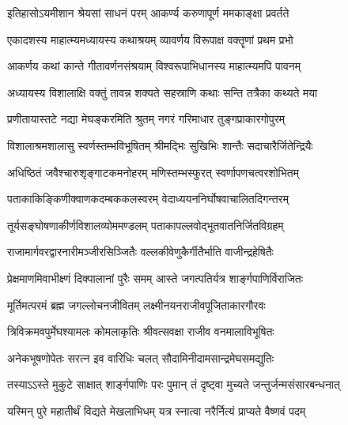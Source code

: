 \genMangalaShloka

\closesub

\ganapatyadiDhyanam
\padmaPuranam



\twolineshloka
{इतिहासोऽयमीशान श्रेयसां साधनं परम्}
{आकर्ण्य करुणापूर्ण ममकाङ्क्षा प्रवर्तते} %

\twolineshloka
{एकादशस्य माहात्म्यमध्यायस्य कथाश्रयम्}
{व्यावर्णय विरूपाक्ष वक्तॄणां प्रथम प्रभो} %


\twolineshloka
{आकर्णय कथां कान्ते गीतावर्णनसंश्रयाम्}
{विश्वरूपाभिधानस्य माहात्म्यमपि पावनम्} %

\twolineshloka
{अध्यायस्य विशालाक्षि वक्तुं तावन्न शक्यते}
{सहस्राणि कथाः सन्ति तत्रैका कथ्यते मया} %

\twolineshloka
{प्रणीतायास्तटे नद्या मेघङ्करमिति श्रुतम्}
{नगरं गरिमाधार तुङ्गप्राकारगोपुरम्} %

\twolineshloka
{विशालाश्रमशालासु स्वर्णस्तम्भविभूषितम्}
{श्रीमद्भिः सुखिभिः शान्तैः सदाचारैर्जितेन्द्रियैः} %

\twolineshloka
{अधिष्ठितं जवैश्चारुशृङ्गाटकमनोहरम्}
{मणिस्तम्भस्फुरत् स्वर्णापणचत्वरशोभितम्} %

\twolineshloka
{पताकाकिङ्किणीक्वाणकदम्बककलस्वरम्}
{वेदाध्ययननिर्घोषवाचालितदिगन्तरम्} %

\twolineshloka
{तूर्यसङ्घोषणाकीर्णविशालव्योममण्डलम्}
{पताकापल्लवोद्भूतवातनिर्जितविग्रहम्} %

\twolineshloka
{राजामार्गवरद्वारनारीमञ्जीरसिञ्जितैः}
{वल्लकीवेणुकैर्गीतैर्भाति वाजीन्द्रहेषितैः} %

\twolineshloka
{प्रेक्षमाणमिवाभीक्ष्णं दिक्पालानां पुरैः समम्}
{आस्ते जगत्पतिर्यत्र शार्ङ्गपाणिर्विराजितः} %

\twolineshloka
{मूर्तिमत्परमं ब्रह्म जगल्लोचनजीवितम्}
{लक्ष्मीनयनराजीवपूजिताकारगौरवः} %

\twolineshloka
{त्रिविक्रमवपुर्मेघश्यामलः कोमलाकृतिः}
{श्रीवत्सवक्षा राजीव वनमालाविभूषितः} %

\twolineshloka
{अनेकभूषणोपेतः सरत्न इव वारिधिः}
{चलत् सौदामिनीदामसान्द्रमेघसमद्युतिः} %

\twolineshloka
{तस्याऽऽस्ते मुकुटे साक्षात् शार्ङ्गपाणिः परः पुमान्}
{तं दृष्ट्वा मुच्यते जन्तुर्जन्मसंसारबन्धनात्} %

\twolineshloka
{यस्मिन् पुरे महातीर्थं विद्यते मेखलाभिधम्}
{यत्र स्नात्वा नरैर्नित्यं प्राप्यते वैष्णवं पदम्} %


